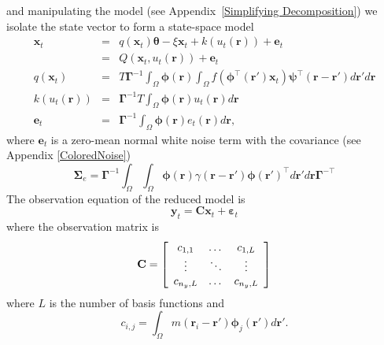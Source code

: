 \documentclass[12pt]{iopart}		%
\begin{document}
and manipulating the model (see Appendix~\ref{Simplifying Decomposition}) we isolate the state vector to form a state-space model
\begin{eqnarray}\label{Homogeneous SS Model}
	\mathbf{x}_t &=& q(\mathbf{x}_t)\boldsymbol{\theta} - \xi\mathbf{x}_t + k\left(u_t\left(\mathbf{r}\right)\right) + \mathbf{e}_t \\
	&=& Q\left(\mathbf{x}_t,u_t(\mathbf{r})\right) + \mathbf{e}_t \\
	q\left(\mathbf{x}_t\right) &=& T\boldsymbol{\Gamma}^{ - 1}\int_\Omega {\boldsymbol{\phi}\left(\mathbf{r}\right) \int_\Omega {f\left(\boldsymbol{\phi}^{\top}\left(\mathbf{r}'\right)\mathbf{x}_t\right)\boldsymbol{\psi}^{\top} \left(\mathbf{r}-\mathbf{r}'\right)d\mathbf{r}'} d\mathbf{r}} \\
	k(u_t(\mathbf{r})) &=& \boldsymbol{\Gamma}^{-1}T \int_\Omega{\boldsymbol{\phi} \left(\mathbf{r}\right) u_t\left(\mathbf{r}\right)d\mathbf{r}} \\
	\mathbf{e}_t &=& \boldsymbol{\Gamma}^{-1}\int_\Omega{\boldsymbol{\phi}\left(\mathbf{r}\right)e_t\left(\mathbf{r}\right)d\mathbf{r}},
\end{eqnarray}
where $\mathbf{e}_t$ is a zero-mean normal white noise term with the covariance (see Appendix \ref{ColoredNoise})
\begin{equation} 
\boldsymbol{\Sigma}_e=\boldsymbol{\Gamma}^{-1}\int_{\Omega}\int_{\Omega}\boldsymbol{\phi}\left(\mathbf r\right) \gamma\left(\mathbf{r}- \mathbf{r}' \right)\boldsymbol{\phi}\left(\mathbf{r}'\right)^{\top}d\mathbf{r}' d\mathbf{r}\boldsymbol{\Gamma}^{- \top} 
\end{equation}
The observation equation of the reduced model is
\begin{equation}\label{ObservationEquation}
    \mathbf{y}_t = \mathbf{C}\mathbf{x}_t + \boldsymbol{\varepsilon}_t
\end{equation}
where the observation matrix is
\begin{equation}
	\mathbf{C} = \left[\begin{array}{{ccc}}
	c_{1,1} & \dots & c_{1,L} \\
	\vdots & \ddots & \vdots \\
	c_{n_y,L} & \dots & c_{n_y,L} \end{array}\right]
\end{equation}
where $L$ is the number of basis functions and
\begin{equation}
	c_{i,j} = \int_{\Omega}m(\mathbf{r}_i - \mathbf{r}')\boldsymbol{\phi}_j(\mathbf{r}')d\mathbf{r}'.
\end{equation}
\end{document}
